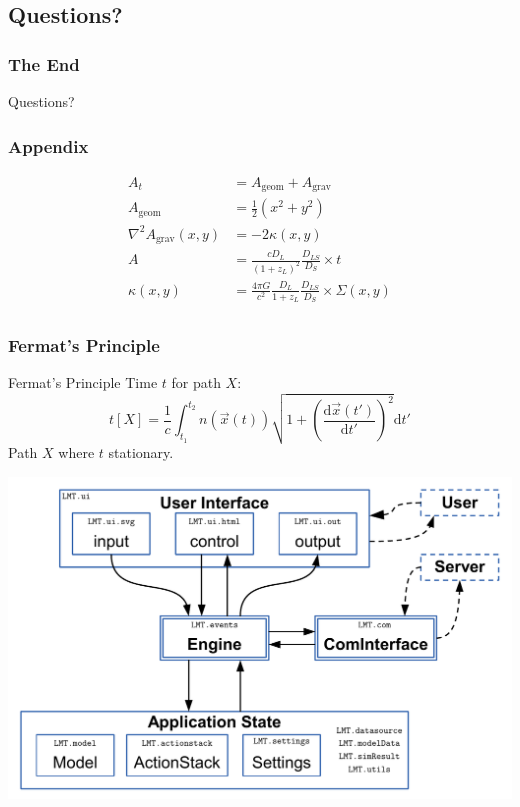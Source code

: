 \documentclass[aspectratio=1610]{beamer}
\begin{document}
\subsection*{Questions?}

\begin{frame}
  \frametitle{The End}
  Questions?
\end{frame}




\appendix

\begin{frame}
  \frametitle{Appendix}
\end{frame}

\begin{frame}
  \begin{align}
    A_t &= A_\text{geom} + A_\text{grav}\\
    A_\text{geom} &= \frac{1}{2}\left(x^2+y^2\right)\\
    \nabla^2 A_\text{grav}\left(x,y\right) &= -2\kappa\left(x,y\right)\\
    A           &= \frac{cD_L}{(1+z_L)^2} \frac{D_{LS}}{D_S} \times t \\
    \kappa(x,y) &= \frac{4\pi G}{c^2} \frac{D_L}{1+z_L} \frac{D_{LS}}{D_S} \times \Sigma(x,y)\\
  \end{align}
  
\end{frame}

\begin{frame}
  \frametitle{Fermat’s Principle}
  \begin{block}{Fermat’s Principle}
    Time $t$ for path $X$:
    $$t\left[X\right] = \frac{1}{c}\int_{t_1}^{t_2}n\left(\vec{x}\left(t\right)\right)\sqrt{1+\left(\frac{\text{d}\vec{x}\left(t'\right)}{\text{d}t'}\right)^2}\text{d}t'$$
    Path $X$ where $t$ stationary.
  \end{block}
\end{frame}



\begin{frame}
  \includegraphics[width=\textwidth]{../techdoc/fig/client}
\end{frame}
\end{document}
